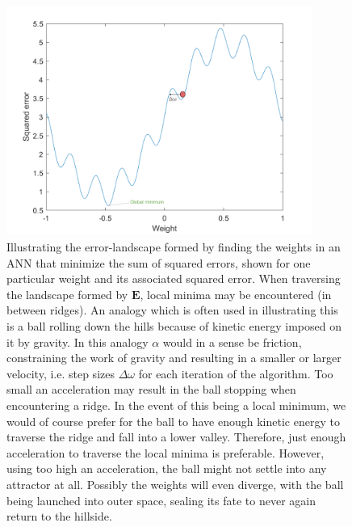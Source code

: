 \begin{figure}
\centering
\includegraphics[width=10cm]{fig/error_landscape_with_ball.png}
\caption{Illustrating the error-landscape formed by finding the weights in an ANN that minimize the sum of squared errors, shown for one particular weight and its associated squared error. When traversing the landscape formed by $\textbf{E}$, local minima may be encountered (in between ridges). An analogy which is often used in illustrating this is a ball rolling down the hills because of kinetic energy imposed on it by gravity. In this analogy $\alpha$ would in a sense be friction, constraining the work of gravity and resulting in a smaller or larger velocity, i.e. step sizes $\Delta \omega$ for each iteration of the algorithm.
Too small an acceleration may result in the ball stopping when encountering a ridge. In the event of this being a local minimum, we would of course prefer for the ball to have enough kinetic energy to traverse the ridge and fall into a lower valley. Therefore, just enough acceleration to traverse the local minima is preferable. However, using too high an acceleration, the ball might not settle into any attractor at all. Possibly the weights will even diverge, with the ball being launched into outer space, sealing its fate to never again return to the hillside.}
\label{fig:steepest_descent}
\end{figure}


